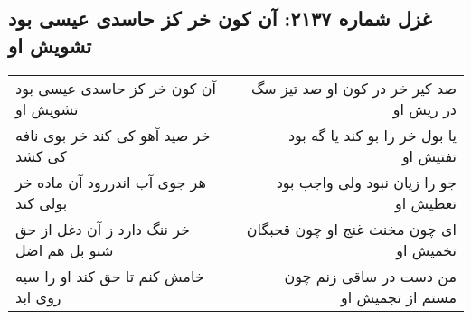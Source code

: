 \begin{center}
\section*{غزل شماره ۲۱۳۷: آن کون خر کز حاسدی عیسی بود تشویش او}
\label{sec:2137}
\begin{longtable}{l p{0.5cm} r}
آن کون خر کز حاسدی عیسی بود تشویش او
&&
صد کیر خر در کون او صد تیز سگ در ریش او
\\
خر صید آهو کی کند خر بوی نافه کی کشد
&&
یا بول خر را بو کند یا گه بود تفتیش او
\\
هر جوی آب اندررود آن ماده خر بولی کند
&&
جو را زیان نبود ولی واجب بود تعطیش او
\\
خر ننگ دارد ز آن دغل از حق شنو بل هم اضل
&&
ای چون مخنث غنج او چون قحبگان تخمیش او
\\
خامش کنم تا حق کند او را سیه روی ابد
&&
من دست در ساقی زنم چون مستم از تجمیش او
\\
\end{longtable}
\end{center}
